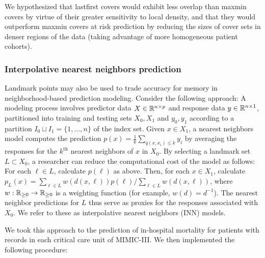 \documentclass{article}
\begin{document}
We hypothesized that lastfirst covers would exhibit less overlap than
maxmin covers by virtue of their greater sensitivity to local density,
and that they would outperform maxmin covers at risk prediction by
reducing the sizes of cover sets in denser regions of the data (taking
advantage of more homogeneous patient cohorts).

\hypertarget{interpolative-nearest-neighbors-prediction}{%
\subsubsection{Interpolative nearest neighbors
prediction}\label{interpolative-nearest-neighbors-prediction}}

Landmark points may also be used to trade accuracy for memory in
neighborhood-based prediction modeling. Consider the following approach:
A modeling process involves predictor data \(X \in \mathbb{R}^{n \times p}\)
and response data \(y \in \mathbb{R}^{n \times 1}\), partitioned into training
and testing sets \(X_0,X_1\) and \(y_0,y_1\) according to a partition
\(I_0 \sqcup I_1 = \{1,\ldots,n\}\) of the index set. Given
\(x \in X_1\), a nearest neighbors model computes the prediction
\(p(x) = \frac{1}{k}\sum_{q(x,x_i) \leq k}{y_i}\) by averaging the
responses for the \(k^\text{th}\) nearest neighbors of \(x\) in \(X_0\).
By selecting a landmark set \(L \subset X_0\), a researcher can reduce
the computational cost of the model as follows: For each \(\ell \in L\),
calculate \(p(\ell)\) as above. Then, for each \(x \in X_1\), calculate
\(p_L(x) = \sum_{\ell \in L}{w(d(x,\ell)) p(\ell)} / \sum_{\ell \in L}{w(d(x,\ell))}\),
where \(w : \mathbb{R}_{\geq 0} \to \mathbb{R}_{\geq 0}\) is a weighting function
(for example, \(w(d)=d^{-1}\)). The nearest neighbor predictions for
\(L\) thus serve as proxies for the responses associated with \(X_0\).
We refer to these as interpolative nearest neighbors (INN) models.

We took this approach to the prediction of in-hospital mortality for
patients with records in each critical care unit of MIMIC-III. We then
implemented the following procedure:
\end{document}
